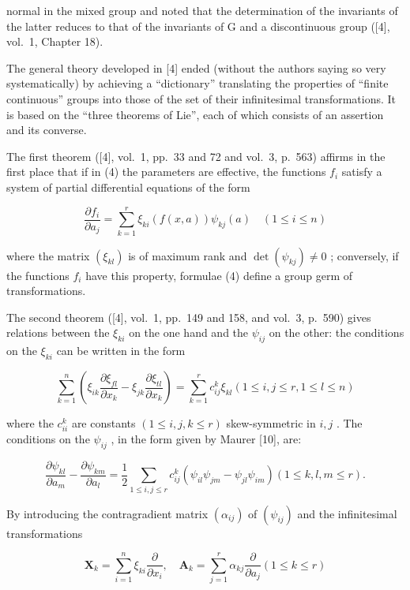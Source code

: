 normal in the mixed group and noted that the determination of the invariants of the latter reduces to that of the invariants of G and a discontinuous group ({[}4{]}, vol.~1, Chapter 18).

The general theory developed in {[}4{]} ended (without the authors saying so very systematically) by achieving a ``dictionary'' translating the properties of ``finite continuous'' groups into those of the set of their infinitesimal transformations. It is based on the ``three theorems of Lie'', each of which consists of an assertion and its converse.

The first theorem ({[}4{]}, vol.~1, pp.~33 and 72 and vol.~3, p.~563) affirms in the first place that if in (4) the parameters are effective, the functions \(f_{i}\) satisfy a system of partial differential equations of the form

\[
\frac {\partial f _ {i}}{\partial a _ {j}} = \sum_ {k = 1} ^ {r} \xi_ {k i} (f (x, a)) \psi_ {k j} (a) \quad (1 \leqslant i \leqslant n)\tag{15}
\]

where the matrix \((\xi_{kl})\) is of maximum rank and \(\det(\psi_{kj}) \neq 0\) ; conversely, if the functions \(f_{i}\) have this property, formulae (4) define a group germ of transformations.

The second theorem ({[}4{]}, vol.~1, pp.~149 and 158, and vol.~3, p.~590) gives relations between the \(\xi_{ki}\) on the one hand and the \(\psi_{ij}\) on the other: the conditions on the \(\xi_{ki}\) can be written in the form

\[
\sum_ {k = 1} ^ {n} \left(\xi_ {i k} \frac {\partial \xi_ {f l}}{\partial x _ {k}} - \xi_ {j k} \frac {\partial \xi_ {t l}}{\partial x _ {k}}\right) = \sum_ {k = 1} ^ {r} c _ {i j} ^ {k} \xi_ {k l} (1 \leqslant i, j \leqslant r, 1 \leqslant l \leqslant n)\tag{16}
\]

where the \(c_{ii}^{k}\) are constants \((1\leqslant i,j,k\leqslant r)\) skew-symmetric in \(i,j\) . The conditions on the \(\psi_{ij}\) , in the form given by Maurer {[}10{]}, are:

\[
\frac {\partial \psi_ {k l}}{\partial a _ {m}} - \frac {\partial \psi_ {k m}}{\partial a _ {l}} = \frac {1}{2} \sum_ {1 \leqslant i, j \leqslant r} c _ {i j} ^ {k} (\psi_ {i l} \psi_ {j m} - \psi_ {j l} \psi_ {i m}) (1 \leqslant k, l, m \leqslant r).\tag{17}
\]

By introducing the contragradient matrix \((\alpha_{ij})\) of \((\psi_{ij})\) and the infinitesimal transformations

\[
\mathbf {X} _ {k} = \sum_ {i = 1} ^ {n} \xi_ {k i} \frac {\partial}{\partial x _ {i}}, \quad \mathbf {A} _ {k} = \sum_ {j = 1} ^ {r} \alpha_ {k j} \frac {\partial}{\partial a _ {j}} (1 \leqslant k \leqslant r)\tag{18}
\]


